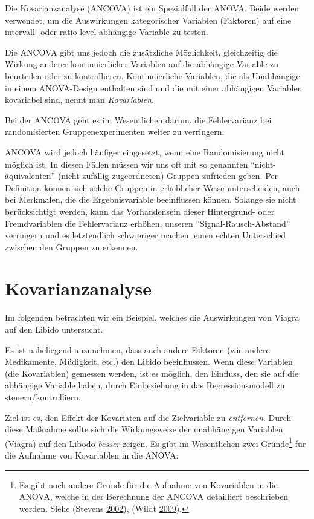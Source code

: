 \documentclass[]{article}
\let\rmarkdownfootnote\footnote%
\def\footnote{\protect\rmarkdownfootnote}
\begin{document}
Die Kovarianzanalyse (ANCOVA) ist ein Spezialfall der ANOVA. Beide
werden verwendet, um die Auswirkungen kategorischer Variablen (Faktoren)
auf eine intervall- oder ratio-level abhängige Variable zu testen.

Die ANCOVA gibt uns jedoch die zusätzliche Möglichkeit, gleichzeitig die
Wirkung anderer kontinuierlicher Variablen auf die abhängige Variable zu
beurteilen oder zu kontrollieren. Kontinuierliche Variablen, die als
Unabhängige in einem ANOVA-Design enthalten sind und die mit einer
abhängigen Variablen kovariabel sind, nennt man \emph{Kovariablen}.

Bei der ANCOVA geht es im Wesentlichen darum, die Fehlervarianz bei
randomisierten Gruppenexperimenten weiter zu verringern.

ANCOVA wird jedoch häufiger eingesetzt, wenn eine Randomisierung nicht
möglich ist. In diesen Fällen müssen wir uns oft mit so genannten
``nicht-äquivalenten'' (nicht zufällig zugeordneten) Gruppen zufrieden
geben. Per Definition können sich solche Gruppen in erheblicher Weise
unterscheiden, auch bei Merkmalen, die die Ergebnisvariable beeinflussen
können. Solange sie nicht berücksichtigt werden, kann das Vorhandensein
dieser Hintergrund- oder Fremdvariablen die Fehlervarianz erhöhen,
unseren ``Signal-Rausch-Abstand'' verringern und es letztendlich
schwieriger machen, einen echten Unterschied zwischen den Gruppen zu
erkennen.

\section*{Kovarianzanalyse}\label{kovarianzanalyse}

Im folgenden betrachten wir ein Beispiel, welches die Auswirkungen von
Viagra auf den Libido untersucht.

Es ist naheliegend anzunehmen, dass auch andere Faktoren (wie andere
Medikamente, Müdigkeit, etc.) den Libido beeinflussen. Wenn diese
Variablen (die Kovariablen) gemessen werden, ist es möglich, den
Einfluss, den sie auf die abhängige Variable haben, durch Einbeziehung
in das Regressionsmodell zu steuern/kontrolliern.

Ziel ist es, den Effekt der Kovariaten auf die Zielvariable zu
\emph{entfernen}. Durch diese Maßnahme sollte sich die Wirkungsweise der
unabhängigen Variablen (Viagra) auf den Libodo \emph{besser} zeigen. Es
gibt im Wesentlichen zwei Gründe\footnote{Es gibt noch andere Gründe für
  die Aufnahme von Kovariablen in die ANOVA, welche in der Berechnung
  der ANCOVA detailliert beschrieben werden. Siehe (Stevens
  \protect\hyperlink{ref-Stevens}{2002}), (Wildt
  \protect\hyperlink{ref-Wildt}{2009}).} für die Aufnahme von
Kovariablen in die ANOVA:
\end{document}
